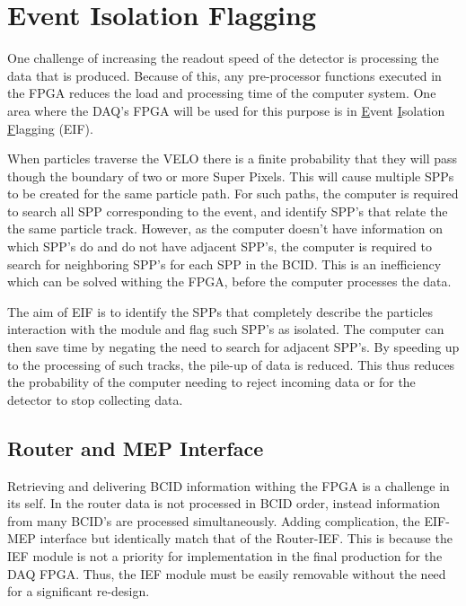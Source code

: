 \section{Event Isolation Flagging}
	
	One challenge of increasing the readout speed of the detector is processing the data that is produced.
	Because of this, any pre-processor functions executed in the FPGA reduces the load and processing time of the computer system.
	One area where the DAQ's FPGA will be used for this purpose is in \underline{E}vent \underline{I}solation \underline{F}lagging (EIF).
	\par
	When particles traverse the VELO there is a finite probability that they will pass though the boundary of two or more Super Pixels.
	This will cause multiple SPPs to be created for the same particle path.
	For such paths, the computer is required to search all SPP corresponding to the event, and identify SPP's that relate the the same particle track. However, as the computer doesn't have information on which SPP's do and do not have adjacent SPP's, the computer is required to search for neighboring SPP's for each SPP in the BCID. This is an inefficiency which can be solved withing the FPGA, before the computer processes the data.
	\par
	The aim of EIF is to identify the SPPs that completely describe the particles interaction with the module and flag such SPP's as isolated.
	The computer can then save time by negating the need to search for adjacent SPP's.
	By speeding up to the processing of such tracks, the pile-up of data is reduced.
	This thus reduces the probability of the computer needing to reject incoming data or for the detector to stop collecting data.

	\subsection{Router and MEP Interface} %
	\label{sub:router_and_mep_interface}

		Retrieving and delivering BCID information withing the FPGA is a challenge in its self.
		In the router data is not processed in BCID order, instead information from many BCID's are processed simultaneously.
		Adding complication, the EIF-MEP interface but identically match that of the Router-IEF.
		This is because the IEF module is not a priority for implementation in the final production for the DAQ FPGA.
		Thus, the IEF module must be easily removable without the need for a significant re-design.

